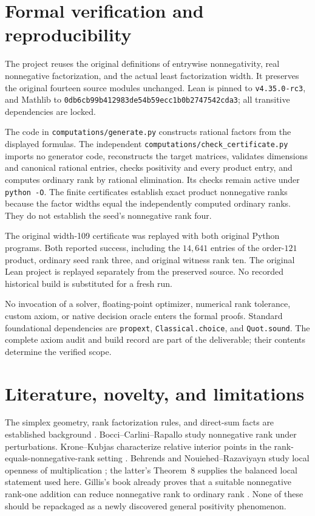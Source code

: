 \documentclass[11pt]{article}
\theoremstyle{definition}\newtheorem{definition}[theorem]{Definition}
\theoremstyle{remark}\newtheorem{remark}[theorem]{Remark}
\newcommand{\code}[1]{\nolinkurl{#1}}
\begin{document}
\section{Formal verification and reproducibility}\label{sec:verification}

The project reuses the original definitions of entrywise nonnegativity, real nonnegative factorization, and the actual least factorization width. It preserves the original fourteen source modules unchanged. Lean is pinned to \code{v4.35.0-rc3}, and Mathlib to \code{0db6cb99b412983de54b59ecc1b0b2747542cda3}; all transitive dependencies are locked.



The code in \code{computations/generate.py} constructs rational factors from the displayed formulas. The independent \code{computations/check_certificate.py} imports no generator code, reconstructs the target matrices, validates dimensions and canonical rational entries, checks positivity and every product entry, and computes ordinary rank by rational elimination. Its checks remain active under \code{python -O}. The finite certificates establish exact product nonnegative ranks because the factor widths equal the independently computed ordinary ranks. They do not establish the seed's nonnegative rank four.

The original width-109 certificate was replayed with both original Python programs. Both reported success, including the $14{,}641$ entries of the order-$121$ product, ordinary seed rank three, and original witness rank ten. The original Lean project is replayed separately from the preserved source. No recorded historical build is substituted for a fresh run.

No invocation of a solver, floating-point optimizer, numerical rank tolerance, custom axiom, or native decision oracle enters the formal proofs. Standard foundational dependencies are \code{propext}, \code{Classical.choice}, and \code{Quot.sound}. The complete axiom audit and build record are part of the deliverable; their contents determine the verified scope.

\section{Literature, novelty, and limitations}\label{sec:novelty}

The simplex geometry, rank factorization rules, and direct-sum facts are established background \cite{CR,BCR,VGGT,QCL}. Bocci--Carlini--Rapallo study nonnegative rank under perturbations. Krone--Kubjas characterize relative interior points in the rank-equals-nonnegative-rank setting \cite[Proposition~5.3]{KK}. Behrends and Nouiehed--Razaviyayn study local openness of multiplication \cite{Behrends,NR}; the latter's Theorem~8 supplies the balanced local statement used here. Gillis's book already proves that a suitable nonnegative rank-one addition can reduce nonnegative rank to ordinary rank \cite[Theorem~3.3]{Gillis}. None of these should be repackaged as a newly discovered general positivity phenomenon.
\end{document}
